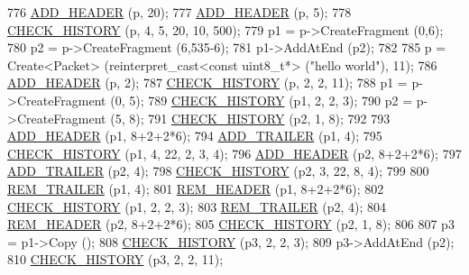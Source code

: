 \begin{DoxyCode}
776   \hyperlink{packet-metadata-test_8cc_a120012d48d29d678b3138d5c7b9bf714}{ADD\_HEADER} (p, 20);
777   \hyperlink{packet-metadata-test_8cc_a120012d48d29d678b3138d5c7b9bf714}{ADD\_HEADER} (p, 5);
778   \hyperlink{packet-metadata-test_8cc_a15a730e778d9d498a39e778bcd39684c}{CHECK\_HISTORY} (p, 4, 5, 20, 10, 500);
779   p1 = p->CreateFragment (0,6);
780   p2 = p->CreateFragment (6,535-6);
781   p1->AddAtEnd (p2);
782 
785   p = Create<Packet> (\textcolor{keyword}{reinterpret\_cast<}\textcolor{keyword}{const }uint8\_t*\textcolor{keyword}{>} (\textcolor{stringliteral}{"hello world"}), 11);
786   \hyperlink{packet-metadata-test_8cc_a120012d48d29d678b3138d5c7b9bf714}{ADD\_HEADER} (p, 2);
787   \hyperlink{packet-metadata-test_8cc_a15a730e778d9d498a39e778bcd39684c}{CHECK\_HISTORY} (p, 2, 2, 11);
788   p1 = p->CreateFragment (0, 5);
789   \hyperlink{packet-metadata-test_8cc_a15a730e778d9d498a39e778bcd39684c}{CHECK\_HISTORY} (p1, 2, 2, 3);
790   p2 = p->CreateFragment (5, 8);
791   \hyperlink{packet-metadata-test_8cc_a15a730e778d9d498a39e778bcd39684c}{CHECK\_HISTORY} (p2, 1, 8);
792 
793   \hyperlink{packet-metadata-test_8cc_a120012d48d29d678b3138d5c7b9bf714}{ADD\_HEADER} (p1, 8+2+2*6);
794   \hyperlink{packet-metadata-test_8cc_ab10bc130bb7184d47509ea44f4fb24df}{ADD\_TRAILER} (p1, 4);
795   \hyperlink{packet-metadata-test_8cc_a15a730e778d9d498a39e778bcd39684c}{CHECK\_HISTORY} (p1, 4, 22, 2, 3, 4);
796   \hyperlink{packet-metadata-test_8cc_a120012d48d29d678b3138d5c7b9bf714}{ADD\_HEADER} (p2, 8+2+2*6);
797   \hyperlink{packet-metadata-test_8cc_ab10bc130bb7184d47509ea44f4fb24df}{ADD\_TRAILER} (p2, 4);
798   \hyperlink{packet-metadata-test_8cc_a15a730e778d9d498a39e778bcd39684c}{CHECK\_HISTORY} (p2, 3, 22, 8, 4);
799 
800   \hyperlink{packet-metadata-test_8cc_a1e12d07d4d7c9ab1695230cdf925b4d6}{REM\_TRAILER} (p1, 4);
801   \hyperlink{packet-metadata-test_8cc_a8694c61c9ba33c72896dde3628538a84}{REM\_HEADER} (p1, 8+2+2*6);
802   \hyperlink{packet-metadata-test_8cc_a15a730e778d9d498a39e778bcd39684c}{CHECK\_HISTORY} (p1, 2, 2, 3);
803   \hyperlink{packet-metadata-test_8cc_a1e12d07d4d7c9ab1695230cdf925b4d6}{REM\_TRAILER} (p2, 4);
804   \hyperlink{packet-metadata-test_8cc_a8694c61c9ba33c72896dde3628538a84}{REM\_HEADER} (p2, 8+2+2*6);
805   \hyperlink{packet-metadata-test_8cc_a15a730e778d9d498a39e778bcd39684c}{CHECK\_HISTORY} (p2, 1, 8);
806 
807   p3 = p1->Copy ();
808   \hyperlink{packet-metadata-test_8cc_a15a730e778d9d498a39e778bcd39684c}{CHECK\_HISTORY} (p3, 2, 2, 3);
809   p3->AddAtEnd (p2);
810   \hyperlink{packet-metadata-test_8cc_a15a730e778d9d498a39e778bcd39684c}{CHECK\_HISTORY} (p3, 2, 2, 11);

\end{DoxyCode}
